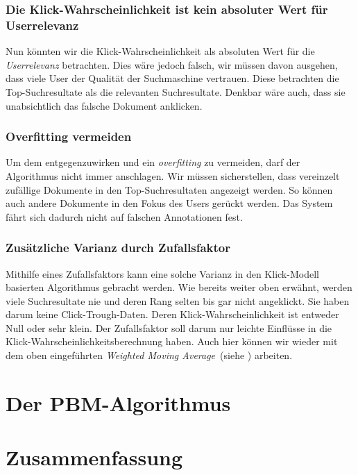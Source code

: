 \subsubsection{Die Klick-Wahrscheinlichkeit ist kein absoluter Wert für Userrelevanz}
\label{sec:Reranking:Methodik:Vergessen:Relevanzfeedback}

Nun könnten wir die Klick-Wahrscheinlichkeit als absoluten Wert für die \textit{Userrelevanz} betrachten. Dies wäre jedoch falsch, wir müssen davon ausgehen, dass viele User der Qualität der Suchmaschine vertrauen. Diese betrachten die Top-Suchresultate als die relevanten Suchresultate. Denkbar wäre auch, dass sie unabsichtlich das falsche Dokument anklicken.

\subsubsection{Overfitting vermeiden}
\label{sec:Reranking:Methodik:Vergessen:Overfitting}

Um dem entgegenzuwirken und ein \textit{overfitting} zu vermeiden, darf der Algorithmus nicht immer anschlagen. Wir müssen sicherstellen, dass vereinzelt zufällige Dokumente in den \glqq Top-Suchresultaten\grqq{} angezeigt werden. So können auch andere Dokumente in den Fokus des Users gerückt werden. Das System fährt sich dadurch nicht auf falschen Annotationen fest. 

\subsubsection{Zusätzliche Varianz durch Zufallsfaktor}
\label{sec:Reranking:Methodik:Vergessen:Zufallsfaktor}

Mithilfe eines Zufallsfaktors kann eine solche Varianz in den Klick-Modell basierten Algorithmus gebracht werden. Wie bereits weiter oben erwähnt, werden viele Suchresultate nie und deren Rang selten bis gar nicht angeklickt. Sie haben darum keine Click-Trough-Daten. Deren Klick-Wahrscheinlichkeit ist entweder Null oder sehr klein. Der Zufallsfaktor soll darum nur leichte Einflüsse in die Klick-Wahrscheinlichkeitsberechnung haben. Auch hier können wir wieder mit dem oben eingeführten \textit{Weighted Moving Average}~(siehe \cite{weightedAVG}) arbeiten.

\section{Der PBM-Algorithmus}
\label{sec:Reranking:PBM-Algorithmus}



\section{Zusammenfassung}
\label{sec:Reranking:Zusammenfassung}
